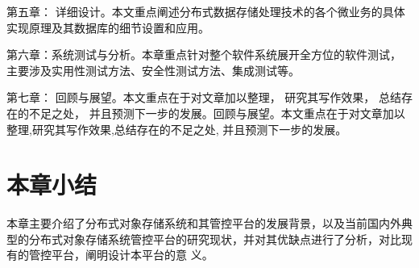 第五章： 详细设计。本文重点阐述分布式数据存储处理技术的各个微业务的具体实现原理及其数据库的细节设置和应用。

第六章：系统测试与分析。本章重点针对整个软件系统展开全方位的软件测试， 主要涉及实用性测试方法、安全性测试方法、集成测试等。

第七章： 回顾与展望。本文重点在于对文章加以整理， 研究其写作效果， 总结存在的不足之处， 并且预测下一步的发展。回顾与展望。本文重点在于对文章加以整理,研究其写作效果,总结存在的不足之处,
并且预测下一步的发展。


\section{本章小结}

本章主要介绍了分布式对象存储系统和其管控平台的发展背景，以及当前国内外典型的分布式对象存储系统管控平台的研究现状，并对其优缺点进行了分析，对比现有的管控平台，阐明设计本平台的意
义。